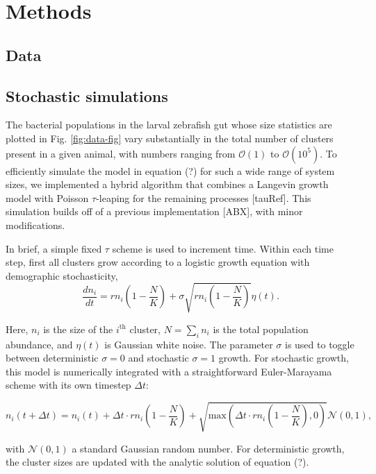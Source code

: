 \documentclass[aps,pre,twocolumn]{revtex4-1}
\def\be{\begin{equation}}
\def\ee{\end{equation}}
\begin{document}
%	
%
%
%
%
%
%

\section{Methods}
\subsection{Data}

\subsection{Stochastic simulations}
The bacterial populations in the larval zebrafish gut whose size statistics are plotted in Fig. \ref{fig:data-fig} vary substantially in the total number of clusters present in a given animal, with numbers ranging from $\mathcal{O}(1)$ to $\mathcal{O}(10^5)$. To efficiently simulate the model in equation (?) for such a wide range of system sizes, we implemented a hybrid algorithm that combines a Langevin growth model with Poisson $\tau$-leaping for the remaining processes [tauRef]. This simulation builds off of a previous implementation [ABX], with minor modifications. 

In brief, a simple fixed $\tau$ scheme is used to increment time. Within each time step, first all clusters grow according to a logistic growth equation with demographic stochasticity,
\be
\frac{dn_i}{dt} = rn_i\left(1-\frac{N}{K}\right) + \sigma\sqrt{rn_i\left(1-\frac{N}{K}\right)}\eta(t).
\ee

Here, $n_i$ is the size of the $i^{\text{th}}$ cluster, $N = \sum_i n_i$ is the total population abundance, and $\eta(t)$ is Gaussian white noise. The parameter $\sigma$ is used to toggle between deterministic $\sigma=0$ and stochastic $\sigma=1$ growth. For stochastic growth, this model is numerically integrated with a straightforward Euler-Marayama scheme with its own timestep $\Delta t$:
\begin{widetext}
\be
n_i(t+\Delta t) = n_i(t) + \Delta t \cdot rn_i\left(1-\frac{N}{K}\right) + \sqrt{\text{max}\left(\Delta t\cdot rn_i\left(1-\frac{N}{K}\right),0\right)}\mathcal{N}(0,1),
\ee
\end{widetext}
with $\mathcal{N}(0,1)$ a standard Gaussian random number. For deterministic growth, the cluster sizes are updated with the analytic solution of equation (?).
\end{document}

